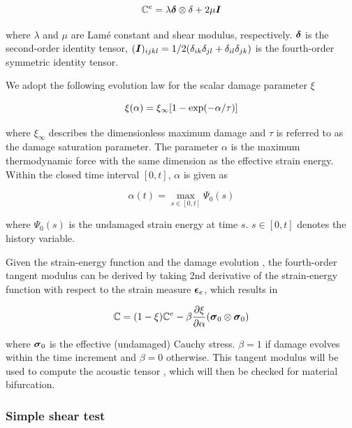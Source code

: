 \documentclass[12pt]{article}
\numberwithin{equation}{section}
\begin{document}
\begin{equation}
  \mathbb{C}^e = \lambda {\boldsymbol{\delta}}\otimes\delta + 2\mu{\boldsymbol{I}}
\end{equation}

where $\lambda$ and $\mu$ are Lam\'{e} constant and shear modulus,
respectively. ${\boldsymbol{\delta}}$ is the second-order identity tensor,
$({\boldsymbol{I}})_{ijkl} = 1/2(\delta_{ik}\delta_{jl} +
\delta_{il}\delta_{jk})$ is the fourth-order symmetric identity
tensor.

We adopt the following evolution law for the scalar damage parameter $
\xi$ \cite{Holzapfel:2000}

\begin{equation}\label{eq:iso_xi}
  \xi(\alpha) = \xi_{\infty} [ 1- {\rm exp}(-\alpha / \tau)]
\end{equation}

where $\xi_{\infty}$ describes the dimensionless maximum damage and
$\tau$ is referred to as the damage saturation parameter. The 
parameter $\alpha$ is the maximum thermodynamic force 
\cite{Holzapfel:2000} with the same dimension as the effective strain 
energy. Within the closed time interval $[0,t]$, $\alpha$ is given as

\begin{equation}\label{eq:alpha}
  \alpha(t) = \max_{s\in [0,t]}\Psi_0(s)
\end{equation}

where $\Psi_0(s)$ is the undamaged strain energy at time $s$.
$s \in [0,t]$ denotes the history variable.

Given the strain-energy function  and the damage
evolution , the fourth-order tangent modulus can be
derived by taking 2nd derivative of the strain-energy function with
respect to the strain measure ${\boldsymbol{\epsilon}}_e$, which results in

\begin{equation}
  \mathbb{C} = (1-\xi)\mathbb{C}^e 
    - \beta \frac{\partial\xi}{\partial\alpha}
    ({\boldsymbol{\sigma}}_0\otimes{\boldsymbol{\sigma}}_0)
\end{equation}

where ${\boldsymbol{\sigma}}_0$ is the effective (undamaged) Cauchy stress. 
$\beta = 1$ if damage evolves within the time increment and $\beta=0$ 
otherwise. This tangent modulus will be used to compute the acoustic 
tensor , which will then be checked for 
material bifurcation.

\subsubsection{Simple shear test}
\end{document}
